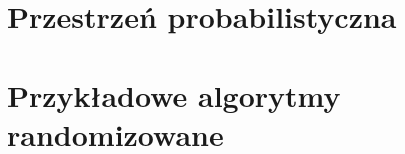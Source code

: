{
\makeatletter
{}
\makeatother
\graphicspath{{../probabil}}

\section{Przestrzeń probabilistyczna}


\newpage
\section{Przykładowe algorytmy randomizowane}

}